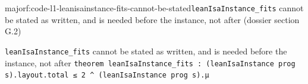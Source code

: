 \begin{finding}{major}{f:code-l1-leanisainstance-fits-cannot-be-stated}{\texttt{leanIsaInstance\_\allowbreak{}fits} cannot be stated as written, and is needed before the instance, not after (dossier section G.2)}
\begin{change}{\texttt{leanIsaInstance\_\allowbreak{}fits} cannot be stated as written, and is needed before the instance, not after}
\asis \texttt{t\allowbreak{}h\allowbreak{}e\allowbreak{}o\allowbreak{}r\allowbreak{}e\allowbreak{}m\allowbreak{} l\allowbreak{}e\allowbreak{}a\allowbreak{}n\allowbreak{}I\allowbreak{}s\allowbreak{}a\allowbreak{}I\allowbreak{}n\allowbreak{}s\allowbreak{}t\allowbreak{}a\allowbreak{}n\allowbreak{}c\allowbreak{}e\allowbreak{}\_\allowbreak{}f\allowbreak{}i\allowbreak{}t\allowbreak{}s\allowbreak{} :\allowbreak{} (\allowbreak{}l\allowbreak{}e\allowbreak{}a\allowbreak{}n\allowbreak{}I\allowbreak{}s\allowbreak{}a\allowbreak{}I\allowbreak{}n\allowbreak{}s\allowbreak{}t\allowbreak{}a\allowbreak{}n\allowbreak{}c\allowbreak{}e\allowbreak{} p\allowbreak{}r\allowbreak{}o\allowbreak{}g\allowbreak{} s\allowbreak{})\allowbreak{}.\allowbreak{}l\allowbreak{}a\allowbreak{}y\allowbreak{}o\allowbreak{}u\allowbreak{}t\allowbreak{}.\allowbreak{}t\allowbreak{}o\allowbreak{}t\allowbreak{}a\allowbreak{}l\allowbreak{} ≤\allowbreak{} 2\allowbreak{} \textasciicircum{}\allowbreak{} (\allowbreak{}l\allowbreak{}e\allowbreak{}a\allowbreak{}n\allowbreak{}I\allowbreak{}s\allowbreak{}a\allowbreak{}I\allowbreak{}n\allowbreak{}s\allowbreak{}t\allowbreak{}a\allowbreak{}n\allowbreak{}c\allowbreak{}e\allowbreak{} p\allowbreak{}r\allowbreak{}o\allowbreak{}g\allowbreak{} s\allowbreak{})\allowbreak{}.\allowbreak{}μ}

\end{change}
\end{finding}
